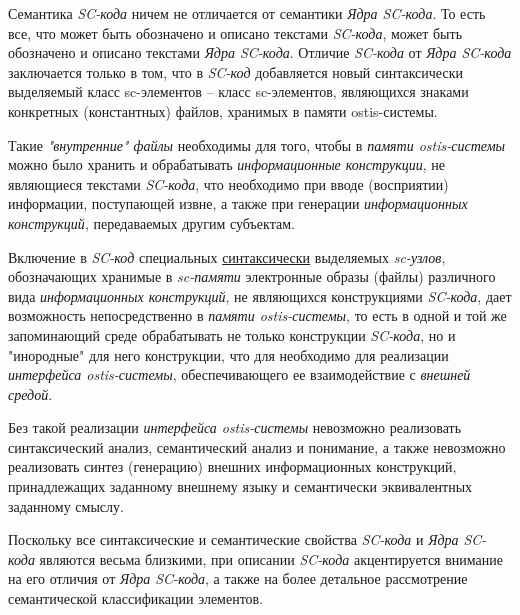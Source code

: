 \begin{SCn}
{Семантика \textit{SC-кода} ничем не отличается от семантики \textit{Ядра SC-кода}. То есть все, что может быть обозначено и описано текстами \textit{SC-кода}, может быть обозначено и описано текстами \textit{Ядра SC-кода}. Отличие \textit{SC-кода} от \textit{Ядра SC-кода} заключается только в том, что в \textit{SC-код} добавляется новый синтаксически выделяемый класс sc-элементов -- класс sc-элементов, являющихся знаками конкретных (константных) файлов, хранимых в памяти ostis-системы. 

Такие \textit{"внутренние"{} файлы} необходимы для того, чтобы в \textit{памяти ostis-системы} можно было хранить и обрабатывать \textit{информационные конструкции}, не являющиеся текстами \textit{SC-кода}, что необходимо при вводе (восприятии) информации, поступающей извне, а также при генерации \textit{информационных конструкций}, передаваемых другим субъектам. 

Включение в \textit{SC-код} специальных \uline{синтаксически} выделяемых \textit{sc-узлов}, обозначающих хранимые в \textit{sc-памяти} электронные образы (файлы) различного вида \textit{информационных конструкций}, не являющихся конструкциями \textit{SC-кода}, дает возможность непосредственно в \textit{памяти ostis-системы}, то есть в одной и той же запоминающий среде обрабатывать не только конструкции \textit{SC-кода}, но и "инородные"{} для него конструкции, что для необходимо для реализации \textit{интерфейса ostis-системы}, обеспечивающего ее взаимодействие с \textit{внешней средой}. 

Без такой реализации \textit{интерфейса ostis-системы} невозможно реализовать синтаксический анализ, семантический анализ и понимание, а также невозможно реализовать синтез (генерацию) внешних информационных конструкций, принадлежащих заданному внешнему языку и семантически эквивалентных заданному смыслу. 

Поскольку все синтаксические и семантические свойства \textit{SC-кода} и \textit{Ядра SC-кода} являются весьма близкими, при описании \textit{SC-кода} акцентируется внимание на его отличия от \textit{Ядра SC-кода}, а также на более детальное рассмотрение семантической классификации элементов.
}

\scnendstruct {}


\end{SCn}
